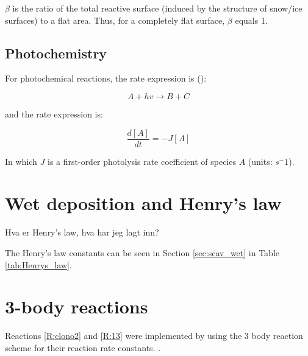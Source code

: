 \medskip

$\beta$ is the ratio of the total reactive surface (induced by the structure of snow/ice surfaces) to a flat area. Thus, for a completely flat surface, $\beta$ equals 1. 





\subsection{Photochemistry}

For photochemical reactions, the rate expression is (\cite{AtmModFund}):

\begin{equation*}
    A + hv \rightarrow B + C
\end{equation*}

and the rate expression is: 

\begin{equation*}
    \frac{d[A]}{dt} = -J[A]
\end{equation*}

In which $J$ is a first-order photolysis rate coefficient of species $A$ (units: $s^-1$). 

\section{Wet deposition and Henry's law}\label{sec:wet_dep_henrys_law}

Hva er Henry's law, hva har jeg lagt inn?

The Henry's law constants can be seen in Section \ref{sec:scav_wet} in Table \ref{tab:Henrys_law}. 


\section{3-body reactions}


Reactions \ref{R:clono2} and \ref{R:13} were implemented by using the 3 body reaction scheme for their reaction rate constants. \cite{SovdeManual}. 